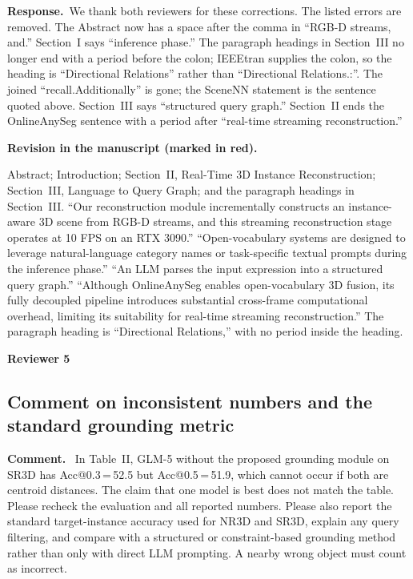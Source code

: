 \documentclass[11pt]{article}
\newcommand{\revcomment}[1]{%
  \par\vspace{0.6em}\noindent\textcolor{revblue}{\textbf{Comment.}}\ %
  \textcolor{revblue}{#1}\par\vspace{0.4em}}
\newcommand{\revresponse}[1]{%
  \par\noindent\textbf{Response.}\ #1\par\vspace{0.3em}}
\newcommand{\revchange}[1]{%
  \par\noindent\textbf{Revision in the manuscript (marked in red).}\par
  \noindent\textcolor{revred}{#1}\par\vspace{0.8em}}
\begin{document}
\revresponse{We thank both reviewers for these corrections. The listed errors are removed. The Abstract now has a space after the comma in ``RGB-D streams, and.'' Section~I says ``inference phase.'' The paragraph headings in Section~III no longer end with a period before the colon; IEEEtran supplies the colon, so the heading is ``Directional Relations'' rather than ``Directional Relations.:''. The joined ``recall.Additionally'' is gone; the SceneNN statement is the sentence quoted above. Section~III says ``structured query graph.'' Section~II ends the OnlineAnySeg sentence with a period after ``real-time streaming reconstruction.''}

\revchange{Abstract; Introduction; Section~II, Real-Time 3D Instance Reconstruction; Section~III, Language to Query Graph; and the paragraph headings in Section~III. ``Our reconstruction module incrementally constructs an instance-aware 3D scene from RGB-D streams, and this streaming reconstruction stage operates at 10 FPS on an RTX 3090.'' ``Open-vocabulary systems are designed to leverage natural-language category names or task-specific textual prompts during the inference phase.'' ``An LLM parses the input expression into a structured query graph.'' ``Although OnlineAnySeg enables open-vocabulary 3D fusion, its fully decoupled pipeline introduces substantial cross-frame computational overhead, limiting its suitability for real-time streaming reconstruction.'' The paragraph heading is ``Directional Relations,'' with no period inside the heading.}

\bigskip
\noindent\textcolor{revblue}{\large\textbf{Reviewer 5}}

\subsection*{Comment on inconsistent numbers and the standard grounding metric}

\revcomment{In Table~II, GLM-5 without the proposed grounding module on SR3D has Acc@0.3\,=\,52.5 but Acc@0.5\,=\,51.9, which cannot occur if both are centroid distances. The claim that one model is best does not match the table. Please recheck the evaluation and all reported numbers. Please also report the standard target-instance accuracy used for NR3D and SR3D, explain any query filtering, and compare with a structured or constraint-based grounding method rather than only with direct LLM prompting. A nearby wrong object must count as incorrect.}
\end{document}
